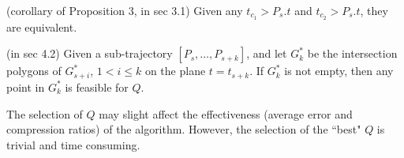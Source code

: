  
 
\begin{cor}
    (corollary of Proposition 3, in sec 3.1) Given any $t_{c_1}> P_s.t$ and $t_{c_2} > P_s.t$, they are equivalent.
\end{cor}
 
(in sec 4.2) Given a sub-trajectory ${[P_s, \ldots, P_{s+k}]}$, and let $G^*_k$ be the intersection polygons of $G^*_{s+i}$, $1<i\le k$ on the plane $t=t_{s+k}$. If $G^*_k$ is not empty, then any point in $G^*_k$ is feasible for $Q$.

The selection of $Q$ may slight affect the effectiveness (\eg average error and compression ratios) of the algorithm. However, the selection of the ``best" $Q$ is trivial and time consuming.


